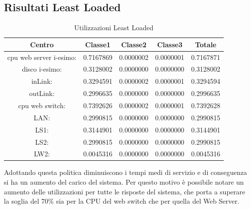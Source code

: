 \subsection{Risultati Least Loaded}
\begin{table}[H]
\begin{center}
\begin{tabular}{||c|c|c|c|c||}
\hline
Centro &Classe1 &Classe2 &Classe3 &Totale\\
\hline
\hline
 cpu web server i-esimo: 	&0.7167869	&0.0000002	&0.0000001	&0.7167871\\
\hline
 disco i-esimo: 	&0.3128002	&0.0000000	&0.0000000	&0.3128002\\
\hline
 inLink: 	&0.3294591	&0.0000002	&0.0000001	&0.3294594\\
\hline
 outLink: 	&0.2996635	&0.0000000	&0.0000000	&0.2996635\\
\hline
 cpu web switch: 	&0.7392626	&0.0000002	&0.0000001	&0.7392628\\
\hline
 LAN: 	&0.2990815	&0.0000000	&0.0000000	&0.2990815\\
\hline
 LS1: 	&0.3144901	&0.0000000	&0.0000000	&0.3144901\\
\hline
 LS2:	&0.2990815	&0.0000000	&0.0000000	&0.2990815\\
\hline
 LW2: 	&0.0045316	&0.0000000	&0.0000000	&0.0045316\\
\hline
\end{tabular}
\end{center}
\caption{Utilizzazioni Least Loaded}
\label{utilizzazioni}
\end{table}
Adottando questa politica diminuiscono i tempi medi di servizio e di conseguenza si ha un aumento del carico del sistema. Per questo motivo è possibile notare un aumento delle utilizzazioni per tutte le risposte del sistema, che porta a superare la soglia del 70\% sia per la CPU del web switch che per quella del Web Server.
